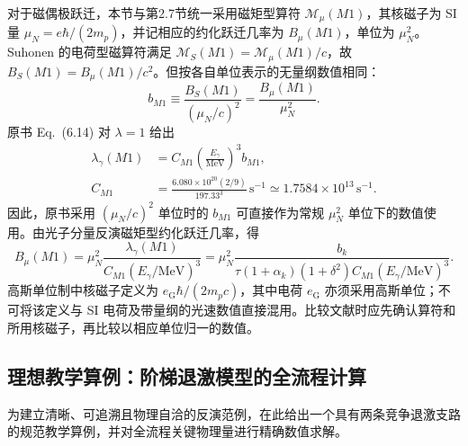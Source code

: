 对于磁偶极跃迁，本节与第2.7节统一采用磁矩型算符 $\mathcal M_{\mu}(M1)$，其核磁子为 SI 量 $\mu_N=e\hbar/(2m_p)$，并记相应的约化跃迁几率为 $B_{\mu}(M1)$，单位为 $\mu_N^2$。Suhonen 的电荷型磁算符满足 $\mathcal M_{S}(M1)=\mathcal M_{\mu}(M1)/c$，故 $B_{S}(M1)=B_{\mu}(M1)/c^2$。但按各自单位表示的无量纲数值相同：
\begin{equation}
b_{M1}\equiv\frac{B_S(M1)}{(\mu_N/c)^2}=\frac{B_\mu(M1)}{\mu_N^2}.
\end{equation}
原书 Eq.~(6.14) 对 $\lambda=1$ 给出~\cite{book-suhonen-from-nucleons-to-nucleus}
\begin{equation}\label{eq:5-9-cm1}
\begin{aligned}
\lambda_\gamma(M1) &= C_{M1}\left(\frac{E_\gamma}{\mathrm{MeV}}\right)^3 b_{M1}, \\
C_{M1} &= \frac{6.080\times10^{20}(2/9)}{197.33^3}\,\mathrm{s}^{-1}\simeq 1.7584\times10^{13}\,\mathrm{s}^{-1}.
\end{aligned}
\end{equation}
因此，原书采用 $(\mu_N/c)^2$ 单位时的 $b_{M1}$ 可直接作为常规 $\mu_N^2$ 单位下的数值使用。由光子分量反演磁矩型约化跃迁几率，得
\begin{equation}\label{eq:5-9-bm1-extracted}
B_{\mu}(M1)=\mu_N^2\frac{\lambda_\gamma(M1)}{C_{M1}(E_\gamma/\mathrm{MeV})^3}
=\mu_N^2\frac{b_k}{\tau(1+\alpha_k)(1+\delta^2)C_{M1}(E_\gamma/\mathrm{MeV})^3}.
\end{equation}
高斯单位制中核磁子定义为 $e_{\mathrm G}\hbar/(2m_pc)$，其中电荷 $e_{\mathrm G}$ 亦须采用高斯单位；不可将该定义与 SI 电荷及带量纲的光速数值直接混用。比较文献时应先确认算符和所用核磁子，再比较以相应单位归一的数值。

\subsection{理想教学算例：阶梯退激模型的全流程计算}\label{subsec:5-9-5}

为建立清晰、可追溯且物理自洽的反演范例，在此给出一个具有两条竞争退激支路的规范教学算例，并对全流程关键物理量进行精确数值求解。

